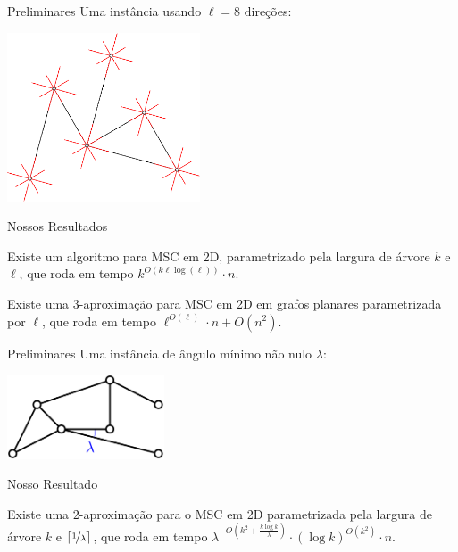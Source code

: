 \begin{frame}{Preliminares}
  \centering
  Uma instância usando $\ell=8$ direções:

  \bigskip
  \begin{minipage}{\linewidth}
    \centering
    \includegraphics[height=5cm]{MSC/directions.png}
  \end{minipage}
\end{frame}

\begin{frame}{Nossos Resultados}
  \begin{thm}
    Existe um algoritmo \FPT para MSC em 2D, parametrizado pela largura de árvore $k$ e $\ell$, que roda em tempo $k^{O(k \ell \log(\ell))} \cdot n$.
  \end{thm}

  \pause
  \begin{cor}
    Existe uma $3$-aproximação para MSC em 2D em grafos planares parametrizada por $\ell$, que roda em tempo $\ell^{O(\ell)} \cdot n + O(n^2)$.
  \end{cor}
\end{frame}

\begin{frame}{Preliminares}
  \centering
  Uma instância de ângulo mínimo não nulo $\lambda$:

  \bigskip
  \begin{minipage}{\linewidth}
    \centering
    \includegraphics[height=2.5cm]{MSC/lambda.png}
  \end{minipage}
\end{frame}

\begin{frame}{Nosso Resultado}
  \begin{thm}
    Existe uma $2$-aproximação para o MSC em 2D parametrizada pela largura de árvore $k$ e $\lceil \nicefrac{1}{\lambda} \rceil$, que roda em tempo $\lambda^{-O(k^2 + \frac{k \log k}{\lambda})} \cdot (\log k)^{O(k^2)} \cdot n$.
  \end{thm}
\end{frame}

